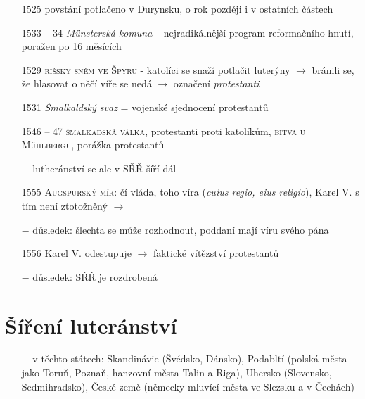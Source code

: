 \documentclass{article}
\begin{document}
\begin{itemize}
    \item[1525] povstání potlačeno v Durynsku, o rok později i v ostatních částech
    \item[1533 -- 34] \textit{Münsterská komuna} -- nejradikálnější program reformačního hnutí, poražen po 16 měsících
    \item[1529] \textsc{říšský sněm ve Špýru} - katolíci se snaží potlačit luterýny $\rightarrow$ bránili se, že hlasovat o něčí víře se nedá $\rightarrow$ označení \textit{protestanti}
    \item[1531] \textit{Šmalkaldský svaz} = vojenské sjednocení protestantů
    \item[1546 -- 47] \textsc{šmalkadská válka}, protestanti proti katolíkům, \textsc{bitva u Mühlbergu}, porážka protestantů
    \item[$-$] lutheránství se ale v SŘŘ šíří dál
    \item[1555] \textsc{Augspurský mír}: čí vláda, toho víra (\textit{cuius regio, eius religio}), Karel V. s tím není ztotožněný $\rightarrow$
    \item[$-$] důsledek: šlechta se může rozhodnout, poddaní mají víru svého pána
    \item[1556] Karel V. odestupuje $\rightarrow$ faktické vítězství protestantů
    \item[$-$] důsledek: SŘŘ je rozdrobená

\end{itemize}

\section*{Šíření luteránství}
\begin{itemize}
    \vspace{-0.5em}
    \setlength\itemsep{0.15em}
    \item[$-$] v těchto státech: Skandinávie (Švédsko, Dánsko), Podabltí (polská města jako Toruň, Poznaň, hanzovní města Talin a Riga), Uhersko (Slovensko, Sedmihradsko), České země (německy mluvící města ve Slezsku a v Čechách) 
\end{itemize}
\end{document}
